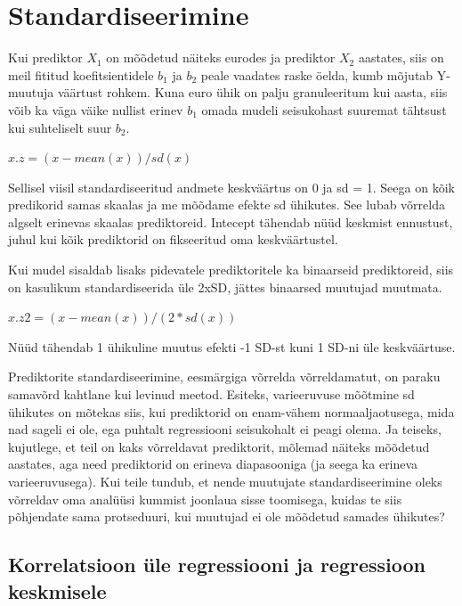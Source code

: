 \documentclass[]{book}
\begin{document}
\section{Standardiseerimine}\label{standardiseerimine}

Kui prediktor \(X_1\) on mõõdetud näiteks eurodes ja prediktor \(X_2\)
aastates, siis on meil fititud koefitsientidele \(b_1\) ja \(b_2\) peale
vaadates raske öelda, kumb mõjutab Y-muutuja väärtust rohkem. Kuna euro
ühik on palju granuleeritum kui aasta, siis võib ka väga väike nullist
erinev \(b_1\) omada mudeli seisukohast suuremat tähtsust kui
suhteliselt suur \(b_2\).

\(x.z = (x - mean(x))/sd(x)\)

Sellisel viisil standardiseeritud andmete keskväärtus on 0 ja sd = 1.
Seega on kõik predikorid samas skaalas ja me mõõdame efekte sd ühikutes.
See lubab võrrelda algselt erinevas skaalas prediktoreid. Intecept
tähendab nüüd keskmist ennustust, juhul kui kõik prediktorid on
fikseeritud oma keskväärtustel.

Kui mudel sisaldab lisaks pidevatele prediktoritele ka binaarseid
prediktoreid, siis on kasulikum standardiseerida üle 2xSD, jättes
binaarsed muutujad muutmata.

\(x.z2 = (x - mean(x))/(2 * sd(x))\)

Nüüd tähendab 1 ühikuline muutus efekti -1 SD-st kuni 1 SD-ni üle
keskväärtuse.

Prediktorite standardiseerimine, eesmärgiga võrrelda võrreldamatut, on
paraku samavõrd kahtlane kui levinud meetod. Esiteks, varieeruvuse
mõõtmine sd ühikutes on mõtekas siis, kui prediktorid on enam-vähem
normaaljaotusega, mida nad sageli ei ole, ega puhtalt regressiooni
seisukohalt ei peagi olema. Ja teiseks, kujutlege, et teil on kaks
võrreldavat prediktorit, mõlemad näiteks mõõdetud aastates, aga need
prediktorid on erineva diapasooniga (ja seega ka erineva
varieeruvusega). Kui teile tundub, et nende muutujate standardiseerimine
oleks võrreldav oma analüüsi kummist joonlaua sisse toomisega, kuidas te
siis põhjendate sama protseduuri, kui muutujad ei ole mõõdetud samades
ühikutes?

\subsection*{Korrelatsioon üle regressiooni ja regressioon
keskmisele}\label{korrelatsioon-ule-regressiooni-ja-regressioon-keskmisele}
\end{document}
